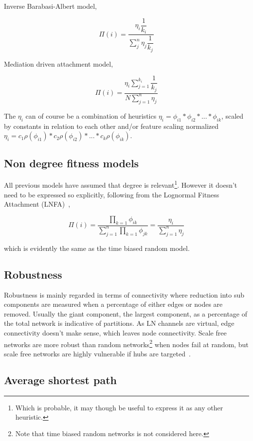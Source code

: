 Inverse Barabasi-Albert model,

\[ \Pi(i) =  \dfrac{\eta_i\dfrac{1}{k_i}}{\sum_{j}^{n}\eta_j \dfrac{1}{k_j}} \]

Mediation driven attachment model,

\[ \Pi(i) = \dfrac{\eta_i\sum_{j=1}^{k_i}\dfrac{1}{k_j}}{N\sum_{j=1}^{n}\eta_j} \]

The $\eta_i$ can of course be a combination of heuristics $\eta_i = \phi_{i1} * \phi_{i2} * ... * \phi_{ik}$, scaled by constants in relation to each other and/or feature scaling normalized $\eta_i = c_1\rho(\phi_{i1}) * c_2\rho(\phi_{i2}) * ... * c_k\rho(\phi_{ik})$.

\subsection{Non degree fitness models}

All previous models have assumed that degree is relevant\footnote{Which is probable, it may though be useful to express it as any other heuristic.}. However it doesn't need to be expressed so explicitly, following from the Lognormal  Fitness Attachment (LNFA)~\cite{bell:logonormal},

\[ \Pi(i) = \dfrac{\prod_{k=1}\phi_{ik}}{\sum_{j=1}^n\prod_{k=1} \phi_{jk}} = \dfrac{\eta_i}{\sum_{j=1}^{n} \eta_j} \]

which is evidently the same as the time biased random model. 

\subsection{Robustness}

Robustness is mainly regarded in terms of connectivity where reduction into sub components are measured when a percentage of either edges or nodes are removed. Usually the giant component, the largest component, as a percentage of the total network is indicative of partitions. As LN channels are virtual, edge connectivity doesn't make sense, which leaves node connectivity. Scale free networks are more robust than random networks\footnote{Note that time biased random networks is not considered here.} when nodes fail at random, but scale free networks are highly vulnerable if hubs are targeted~\cite{barabasi:robustness}. 



\subsection{Average shortest path}


